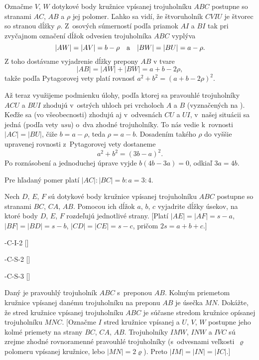 {%
Označme $V$, $W$ dotykové body kružnice vpísanej
trojuholníku $ABC$ postupne so stranami $AC$, $AB$ a $\rho$ jej polomer.
Ľahko sa vidí, že štvoruholník $CVIU$ je štvorec so
stranou dĺžky $\rho$. Z~osových súmerností podľa priamok $AI$ a
$BI$ tak pri zvyčajnom označení dĺžok odvesien trojuholníka $ABC$
vyplýva
$$
|AW|=|AV|=b-\rho\quad\hbox{a}\quad
|BW|=|BU|=a-\rho.
$$
Z toho dostávame vyjadrenie dĺžky prepony $AB$ v tvare
$$
|AB|=|AW|+|BW|=a+b-2\rho,
$$
takže podľa Pytagorovej vety platí rovnosť
$a^2+b^2=(a+b-2\rho)^2$.
%

Až teraz využijeme podmienku úlohy, podľa ktorej sa pravouhlé
trojuholníky $ACU$ a $BUI$ zhodujú v~ostrých uhloch pri vrcholoch $A$ a $B$
(vyznačených na \obr). Keďže sa (vo všeobecnosti) zhodujú
aj v~odvesnách $CU$ a $UI$, v~našej situácii sa jedná (podľa vety {\it
usu}) o~dva zhodné trojuholníky. To nás vedie k~rovnosti $|AC|=|BU|$,
čiže $b={a-\rho}$, teda $\rho=a-b$. Dosadením takého $\rho$
do vyššie upravenej rovnosti z~Pytagorovej vety dostaneme
$$
a^2+b^2=(3b-a)^2.
$$
Po roznásobení a jednoduchej úprave vyjde $b(4b-3a)=0$, odkiaľ $3a=4b$.

\Zav
Pre hľadaný pomer platí $|AC|:|BC|=b:a=3:4$.


Nech $D$, $E$, $F$ sú dotykové body kružnice
vpísanej trojuholníku $ABC$ postupne so stranami $BC$, $CA$, $AB$. Pomocou
ich dĺžok $a$, $b$, $c$ vyjadrite dĺžky úsekov, na ktoré
body $D$, $E$, $F$ rozdeľujú jednotlivé strany.
[Platí $|AE|=|AF|=s-a$, $|BF|=|BD|=s-b$, $|CD|=|CE|=s-c$, pričom $2s=a+b+c$.]

-C-I-2
[]

-C-S-2
[]

-C-S-3
[]

\DOP
Daný je pravouhlý trojuholník $ABC$ s~preponou $AB$.
Kolmým priemetom kružnice vpísanej danému trojuholníku na preponu $AB$
je úsečka $MN$. Dokážte, že stred kružnice vpísanej trojuholníku $ABC$
je súčasne stredom kružnice opísanej trojuholníku $MNC$.
[Označme $I$ stred kružnice vpísanej a $U$, $V$, $W$
postupne jeho kolmé priemety na strany $BC$, $CA$, $AB$.
Trojuholníky $IMW$, $INW$ a $IVC$ sú zrejme zhodné rovnoramenné
pravouhlé trojuholníky (s~odvesnami veľkosti~$\varrho$ polomeru
vpísanej kružnice, lebo $|MN| =2\varrho$). Preto
$|IM|=|IN|=|IC|$.]

}

